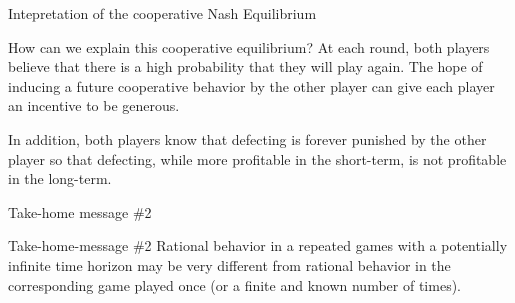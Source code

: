 
\begin{frame}{Intepretation of the cooperative Nash Equilibrium}
    \begin{block}{How can we explain this cooperative equilibrium?}
        At each round, both players believe that there is a high probability that they
        will play again. The hope of inducing a future cooperative behavior by the other
        player can give each player an incentive to be generous.

        In addition, both players know that defecting is forever punished by the other
        player so that defecting, while more profitable in the short-term, is not profitable
        in the long-term.
    \end{block}
\end{frame}

\begin{frame}{Take-home message \#2}
    \begin{block}{Take-home-message \#2}
        Rational behavior in a repeated games with a potentially infinite time horizon may be
        very different from rational behavior in the corresponding game played once (or a finite
        and known number of times).
    \end{block}
\end{frame}

